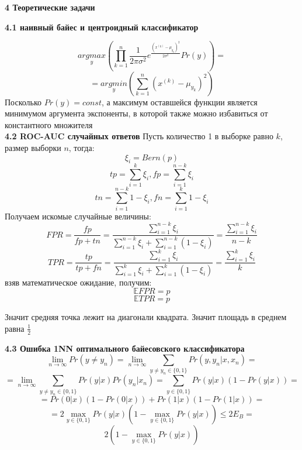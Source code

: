 \documentclass[11pt,a4paper]{article}
\begin{document}
\begin{center}
\Huge {
\noindent
\textbf{4 Теоретические задачи}
}
\end{center}
\Large {
\textbf {4.1 наивный байес и центроидный классификатор}
}

$$ \underset{y}{argmax} (\prod_{k=1}^{n} \frac{1}{2\pi \sigma^2}e^{\frac{(x^{(k)} - \mu_{y_k})^2}{2 \sigma^2}}  Pr(y)) = $$
$$=\underset{y}{argmin} (\sum_{k=1}^{n} (x^{(k)} - \mu_{y_k})^2) $$
Посколько $Pr(y) = const$,
а максимум оставшейся функции является минимумом аргумента экспоненты, в которой также можно избавиться от константного множителя
\\
\Large{
\textbf {4.2 ROC-AUC случайных ответов}
}
Пусть количество 1 в выборке равно $k$, размер выборки $n$, тогда:
\\
$$ \xi_i = Bern(p) $$
$$ tp = \sum_{i=1}^{k} \xi_i,  fp = \sum_{i=1}^{n - k} \xi_i$$
$$ tn = \sum_{i=1}^{n - k} 1- \xi_i,  fn = \sum_{i=1}^{k} 1 - \xi_i$$
Получаем искомые случайные величины:
$$ FPR = \frac{fp}{fp + tn} = \frac{\sum_{i=1}^{n-k} \xi_i}{\sum_{i=1}^{n-k} \xi_i + \sum_{i=1}^{n-k} (1 - \xi_i)} = \frac{\sum_{i=1}^{n-k} \xi_i}{n-k}$$
$$ TPR = \frac{tp}{tp + fn} = \frac{\sum_{i=1}^{k} \xi_i}{\sum_{i=1}^k \xi_i + \sum_{i=1}^{k} (1 - \xi_i)} = \frac{\sum_{i=1}^{k}  \xi_i}{k}$$
взяв математическое ожидание, получим:
$$ \mathbb{E} FPR = p$$
$$ \mathbb{E} TPR = p$$

Значит средняя точка лежит на диагонали квадрата. Значит площадь в среднем равна $\frac{1}{2}$

\Large{
\textbf {4.3 Ошибка 1NN оптимального байесовского классификатора}
}
$$ \lim_{n \to \infty} Pr(y \ne y_n) = \lim_{n \to \infty} \sum_{y \ne y_n \in \{0, 1\}} Pr(y, y_n | x, x_n) =$$
$$= \lim_{n \to \infty} \sum_{y \ne y_n \in \{0, 1\}} Pr(y|x) Pr(y_n|x_n) = \sum_{y \in \{0, 1\}} Pr(y|x) (1 - Pr(y|x)) = $$
$$= Pr(0|x)(1 - Pr(0|x)) + Pr(1 | x) (1 - Pr(1 | x)) = $$
$$= 2 \max_{y \in \{0, 1\}} Pr(y|x) (1 - \max_{y \in \{0, 1\}} Pr(y|x)) \le 2E_B = $$
$$ 2 (1 - \max_{y \in \{0, 1\}} Pr(y|x))$$
\end{document}
